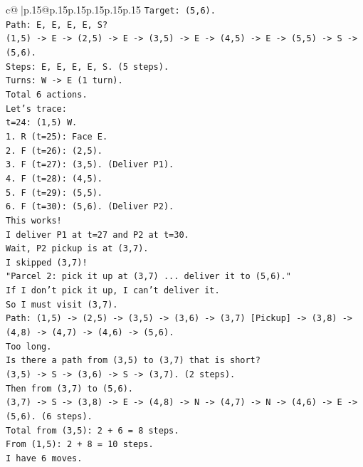 \documentclass{article}
\begin{document}
{\begin{supertabular}{c@{$\;$}|p{.15\linewidth}@{}p{.15\linewidth}p{.15\linewidth}p{.15\linewidth}p{.15\linewidth}p{.15\linewidth}}
{{{\texttt{Target: (5,6).} \\
\texttt{Path: E, E, E, E, S?} \\
\texttt{(1,5) {-}> E {-}> (2,5) {-}> E {-}> (3,5) {-}> E {-}> (4,5) {-}> E {-}> (5,5) {-}> S {-}> (5,6).} \\
\texttt{Steps: E, E, E, E, S. (5 steps).} \\
\texttt{Turns: W {-}> E (1 turn).} \\
\texttt{Total 6 actions.} \\
\texttt{Let's trace:} \\
\texttt{t=24: (1,5) W.} \\
\texttt{1. R (t=25): Face E.} \\
\texttt{2. F (t=26): (2,5).} \\
\texttt{3. F (t=27): (3,5). (Deliver P1).} \\
\texttt{4. F (t=28): (4,5).} \\
\texttt{5. F (t=29): (5,5).} \\
\texttt{6. F (t=30): (5,6). (Deliver P2).} \\
\texttt{This works!} \\
\texttt{I deliver P1 at t=27 and P2 at t=30.} \\
\texttt{Wait, P2 pickup is at (3,7).} \\
\texttt{I skipped (3,7)!} \\
\texttt{"Parcel 2: pick it up at (3,7) ... deliver it to (5,6)."} \\
\texttt{If I don't pick it up, I can't deliver it.} \\
\texttt{So I must visit (3,7).} \\
\texttt{Path: (1,5) {-}> (2,5) {-}> (3,5) {-}> (3,6) {-}> (3,7) {[}Pickup{]} {-}> (3,8) {-}> (4,8) {-}> (4,7) {-}> (4,6) {-}> (5,6).} \\
\texttt{Too long.} \\
\texttt{Is there a path from (3,5) to (3,7) that is short?} \\
\texttt{(3,5) {-}> S {-}> (3,6) {-}> S {-}> (3,7). (2 steps).} \\
\texttt{Then from (3,7) to (5,6).} \\
\texttt{(3,7) {-}> S {-}> (3,8) {-}> E {-}> (4,8) {-}> N {-}> (4,7) {-}> N {-}> (4,6) {-}> E {-}> (5,6). (6 steps).} \\
\texttt{Total from (3,5): 2 + 6 = 8 steps.} \\
\texttt{From (1,5): 2 + 8 = 10 steps.} \\
\texttt{I have 6 moves.} \\
}}}
\end{supertabular}}
\end{document}
